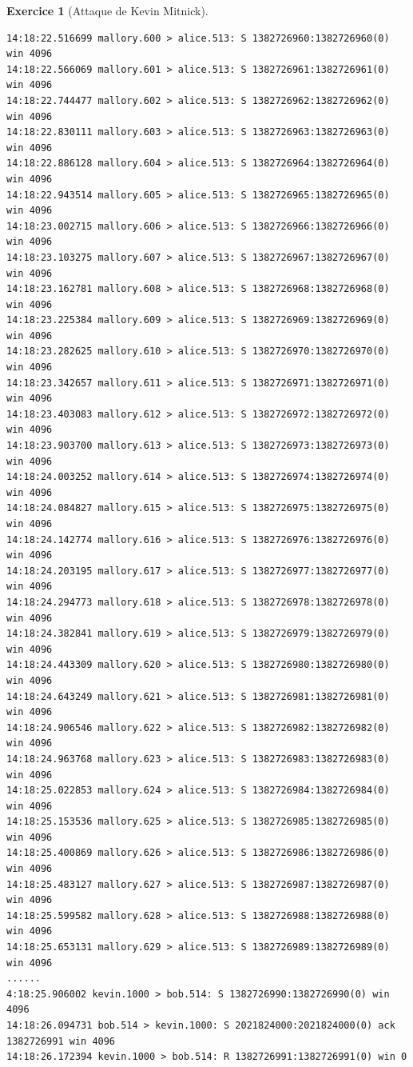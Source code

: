 \documentclass[a4paper,9pt]{article}
\theoremstyle{plain}
\theoremstyle{definition}
\newtheorem{exercice}{Exercice}
\begin{document}
\begin{exercice}[Attaque de Kevin Mitnick]
\begin{verbatim}
14:18:22.516699 mallory.600 > alice.513: S 1382726960:1382726960(0) win 4096
14:18:22.566069 mallory.601 > alice.513: S 1382726961:1382726961(0) win 4096
14:18:22.744477 mallory.602 > alice.513: S 1382726962:1382726962(0) win 4096
14:18:22.830111 mallory.603 > alice.513: S 1382726963:1382726963(0) win 4096
14:18:22.886128 mallory.604 > alice.513: S 1382726964:1382726964(0) win 4096
14:18:22.943514 mallory.605 > alice.513: S 1382726965:1382726965(0) win 4096
14:18:23.002715 mallory.606 > alice.513: S 1382726966:1382726966(0) win 4096
14:18:23.103275 mallory.607 > alice.513: S 1382726967:1382726967(0) win 4096
14:18:23.162781 mallory.608 > alice.513: S 1382726968:1382726968(0) win 4096
14:18:23.225384 mallory.609 > alice.513: S 1382726969:1382726969(0) win 4096
14:18:23.282625 mallory.610 > alice.513: S 1382726970:1382726970(0) win 4096
14:18:23.342657 mallory.611 > alice.513: S 1382726971:1382726971(0) win 4096
14:18:23.403083 mallory.612 > alice.513: S 1382726972:1382726972(0) win 4096
14:18:23.903700 mallory.613 > alice.513: S 1382726973:1382726973(0) win 4096
14:18:24.003252 mallory.614 > alice.513: S 1382726974:1382726974(0) win 4096
14:18:24.084827 mallory.615 > alice.513: S 1382726975:1382726975(0) win 4096
14:18:24.142774 mallory.616 > alice.513: S 1382726976:1382726976(0) win 4096
14:18:24.203195 mallory.617 > alice.513: S 1382726977:1382726977(0) win 4096
14:18:24.294773 mallory.618 > alice.513: S 1382726978:1382726978(0) win 4096
14:18:24.382841 mallory.619 > alice.513: S 1382726979:1382726979(0) win 4096
14:18:24.443309 mallory.620 > alice.513: S 1382726980:1382726980(0) win 4096
14:18:24.643249 mallory.621 > alice.513: S 1382726981:1382726981(0) win 4096
14:18:24.906546 mallory.622 > alice.513: S 1382726982:1382726982(0) win 4096
14:18:24.963768 mallory.623 > alice.513: S 1382726983:1382726983(0) win 4096
14:18:25.022853 mallory.624 > alice.513: S 1382726984:1382726984(0) win 4096
14:18:25.153536 mallory.625 > alice.513: S 1382726985:1382726985(0) win 4096
14:18:25.400869 mallory.626 > alice.513: S 1382726986:1382726986(0) win 4096
14:18:25.483127 mallory.627 > alice.513: S 1382726987:1382726987(0) win 4096
14:18:25.599582 mallory.628 > alice.513: S 1382726988:1382726988(0) win 4096
14:18:25.653131 mallory.629 > alice.513: S 1382726989:1382726989(0) win 4096
......
4:18:25.906002 kevin.1000 > bob.514: S 1382726990:1382726990(0) win 4096
14:18:26.094731 bob.514 > kevin.1000: S 2021824000:2021824000(0) ack 1382726991 win 4096
14:18:26.172394 kevin.1000 > bob.514: R 1382726991:1382726991(0) win 0

\end{verbatim}
\end{exercice}
\end{document}
